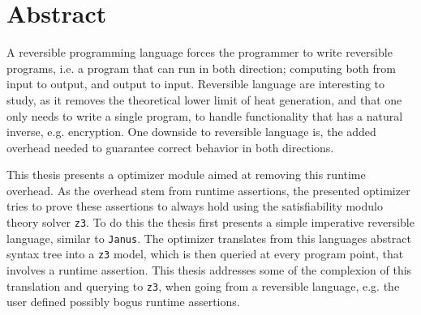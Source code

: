 \section*{Abstract}
A reversible programming language forces the programmer to write reversible programs, i.e.
a program that can run in both direction; computing both from input to output, and output to
input. Reversible language are interesting to study, as it removes the theoretical lower limit
of heat generation, and that one only needs to write a single program, to handle functionality
that has a natural inverse, e.g. encryption. One downside to reversible language is, the added
overhead needed to guarantee correct behavior in both directions.

This thesis presents a optimizer module aimed at removing this runtime overhead. As the overhead
stem from runtime assertions, the presented optimizer tries to prove these assertions to always
hold using the satisfiability modulo  theory solver \texttt{z3}. To do this the thesis first
presents a simple imperative reversible language, similar to \texttt{Janus}. The optimizer
translates from this languages abstract syntax tree into a \texttt{z3} model, which is then
queried at every program point, that involves a runtime assertion. This thesis addresses some
of the complexion of this translation and querying to \texttt{z3}, when going from a reversible
language, e.g. the user defined possibly bogus runtime assertions.
